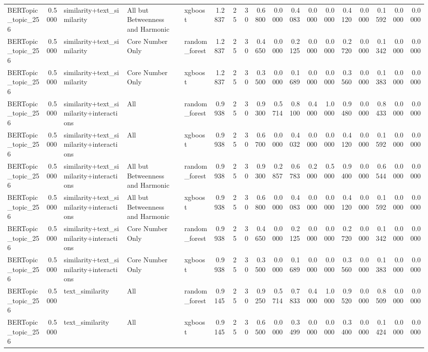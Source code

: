 \begin{tabular}{lrlllrrrrrrrrrrrrr}
BERTopic_topic_256 & 0.5000 & similarity+text_similarity & All but Betweenness and Harmonic & xgboost & 1.2837 & 25 & 30 & 0.6800 & 0.0000 & 0.4083 & 0.0000 & 0.0000 & 0.4120 & 0.0000 & 0.1592 & 0.0000 & 0.0000 \\
BERTopic_topic_256 & 0.5000 & similarity+text_similarity & Core Number Only & random_forest & 1.2837 & 25 & 30 & 0.4650 & 0.0000 & 0.2125 & 0.0000 & 0.0000 & 0.2720 & 0.0000 & 0.1342 & 0.0000 & 0.0000 \\
BERTopic_topic_256 & 0.5000 & similarity+text_similarity & Core Number Only & xgboost & 1.2837 & 25 & 30 & 0.3500 & 0.0000 & 0.1689 & 0.0000 & 0.0000 & 0.3560 & 0.0000 & 0.1383 & 0.0000 & 0.0000 \\
BERTopic_topic_256 & 0.5000 & similarity+text_similarity+interactions & All & random_forest & 0.9938 & 25 & 30 & 0.9300 & 0.5714 & 0.8100 & 0.4000 & 1.0000 & 0.9480 & 0.0000 & 0.8433 & 0.0000 & 0.0000 \\
BERTopic_topic_256 & 0.5000 & similarity+text_similarity+interactions & All & xgboost & 0.9938 & 25 & 30 & 0.6700 & 0.0000 & 0.4032 & 0.0000 & 0.0000 & 0.4120 & 0.0000 & 0.1592 & 0.0000 & 0.0000 \\
BERTopic_topic_256 & 0.5000 & similarity+text_similarity+interactions & All but Betweenness and Harmonic & random_forest & 0.9938 & 25 & 30 & 0.9300 & 0.2857 & 0.6783 & 0.2000 & 0.5000 & 0.9400 & 0.0000 & 0.6544 & 0.0000 & 0.0000 \\
BERTopic_topic_256 & 0.5000 & similarity+text_similarity+interactions & All but Betweenness and Harmonic & xgboost & 0.9938 & 25 & 30 & 0.6800 & 0.0000 & 0.4083 & 0.0000 & 0.0000 & 0.4120 & 0.0000 & 0.1592 & 0.0000 & 0.0000 \\
BERTopic_topic_256 & 0.5000 & similarity+text_similarity+interactions & Core Number Only & random_forest & 0.9938 & 25 & 30 & 0.4650 & 0.0000 & 0.2125 & 0.0000 & 0.0000 & 0.2720 & 0.0000 & 0.1342 & 0.0000 & 0.0000 \\
BERTopic_topic_256 & 0.5000 & similarity+text_similarity+interactions & Core Number Only & xgboost & 0.9938 & 25 & 30 & 0.3500 & 0.0000 & 0.1689 & 0.0000 & 0.0000 & 0.3560 & 0.0000 & 0.1383 & 0.0000 & 0.0000 \\
BERTopic_topic_256 & 0.5000 & text_similarity & All & random_forest & 0.9145 & 25 & 30 & 0.9250 & 0.5714 & 0.7833 & 0.4000 & 1.0000 & 0.9520 & 0.0000 & 0.8509 & 0.0000 & 0.0000 \\
BERTopic_topic_256 & 0.5000 & text_similarity & All & xgboost & 0.9145 & 25 & 30 & 0.6500 & 0.0000 & 0.3499 & 0.0000 & 0.0000 & 0.3400 & 0.0000 & 0.1424 & 0.0000 & 0.0000 \\

\end{tabular}
